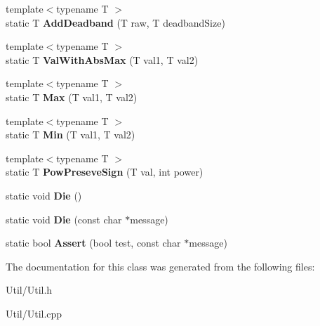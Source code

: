 \begin{DoxyCompactItemize}
\item 
\hypertarget{class_util_afc2afb1ef9fcc6f47277931ffe26b421}{{\footnotesize template$<$typename T $>$ }\\static \-T {\bfseries \-Add\-Deadband} (\-T raw, \-T deadband\-Size)}\label{class_util_afc2afb1ef9fcc6f47277931ffe26b421}

\item 
\hypertarget{class_util_ad81fcab61c9cbcbea59a61e68e77ba60}{{\footnotesize template$<$typename T $>$ }\\static \-T {\bfseries \-Val\-With\-Abs\-Max} (\-T val1, \-T val2)}\label{class_util_ad81fcab61c9cbcbea59a61e68e77ba60}

\item 
\hypertarget{class_util_a8430d16e2dde9becfe7f6f22f0ed82bf}{{\footnotesize template$<$typename T $>$ }\\static \-T {\bfseries \-Max} (\-T val1, \-T val2)}\label{class_util_a8430d16e2dde9becfe7f6f22f0ed82bf}

\item 
\hypertarget{class_util_a58c0162c35e293d94f8fdfe5df4f8df9}{{\footnotesize template$<$typename T $>$ }\\static \-T {\bfseries \-Min} (\-T val1, \-T val2)}\label{class_util_a58c0162c35e293d94f8fdfe5df4f8df9}

\item 
\hypertarget{class_util_adf538ad330a0b0962a49b2692d777df2}{{\footnotesize template$<$typename T $>$ }\\static \-T {\bfseries \-Pow\-Preseve\-Sign} (\-T val, int power)}\label{class_util_adf538ad330a0b0962a49b2692d777df2}

\item 
\hypertarget{class_util_ace9563b1a67ff4f43c95aafda00978d0}{static void {\bfseries \-Die} ()}\label{class_util_ace9563b1a67ff4f43c95aafda00978d0}

\item 
\hypertarget{class_util_a1ad96657e2a363fb601d058d14d5e9d8}{static void {\bfseries \-Die} (const char $\ast$message)}\label{class_util_a1ad96657e2a363fb601d058d14d5e9d8}

\item 
\hypertarget{class_util_a49e0d861927bda16820e16dda8dfdc74}{static bool {\bfseries \-Assert} (bool test, const char $\ast$message)}\label{class_util_a49e0d861927bda16820e16dda8dfdc74}

\end{DoxyCompactItemize}


\-The documentation for this class was generated from the following files\-:\begin{DoxyCompactItemize}
\item 
\-Util/\-Util.\-h\item 
\-Util/\-Util.\-cpp\end{DoxyCompactItemize}
